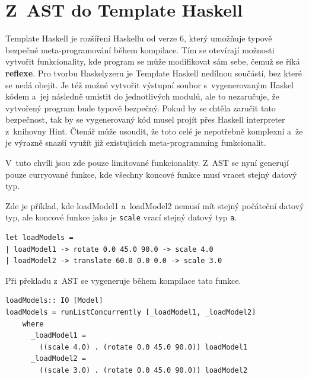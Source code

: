 \documentclass[male, czech]{kithesis}
\newenvironment{code}{\captionsetup{type=listing}}{}
\newcommand{\haskellInline}[1]{\colorbox{gray!10}{\texttt{#1}}}
\begin{document}
\section{Z~AST do Template Haskell}
Template Haskell je rozšíření Haskellu od verze 6, 
který umožňuje typově bezpečné meta-programování během kompilace.
Tím se otevírají možnosti vytvořit funkcionality, 
kde program se může modifikovat sám sebe, 
čemuž se říká \textbf{reflexe}.
Pro tvorbu Haskelyzeru je Template Haskell nedílnou součástí,
bez které se nedá obejít.
Je též možné vytvořit výstupní soubor s~vygenerovaným Haskel kódem
a~jej následně umístit do jednotlivých modulů,
ale to nezaručuje, 
že vytvořený program bude typově bezpečný.
Pokud by se chtěla zaručit tato bezpečnost,
tak by se vygenerovaný kód musel projít přes 
Haskell interpreter z~knihovny Hint.
Čtenář může usoudit, 
že toto celé je nepotřebně komplexní
a~že je výrazně snazší využít již existujicích meta-programming funkcionalit. 

V~tuto chvíli jsou zde pouze limitované funkcionality.
Z~AST se nyní generují pouze curryované funkce,
kde všechny koncové funkce musí vracet stejný datový typ.

Zde je příklad, 
kde loadModel1
a~loadModel2 nemusí mít stejný počáteční datový typ, 
ale koncové funkce jako je \haskellInline{scale} 
vrací stejný datový typ \haskellInline{a}.

\begin{code}
\begin{verbatim}
let loadModels =
| loadModel1 -> rotate 0.0 45.0 90.0 -> scale 4.0
| loadModel2 -> translate 60.0 0.0 0.0 -> scale 3.0
\end{verbatim}
\end{code}

\newpage

Při překladu z~AST se vygeneruje během kompilace tato funkce.

\begin{code}
\begin{verbatim}
loadModels:: IO [Model]
loadModels = runListConcurrently [_loadModel1, _loadModel2] 
    where 
      _loadModel1 = 
        ((scale 4.0) . (rotate 0.0 45.0 90.0)) loadModel1
      _loadModel2 = 
        ((scale 3.0) . (rotate 0.0 45.0 90.0)) loadModel2
\end{verbatim}
\end{code}
\end{document}
